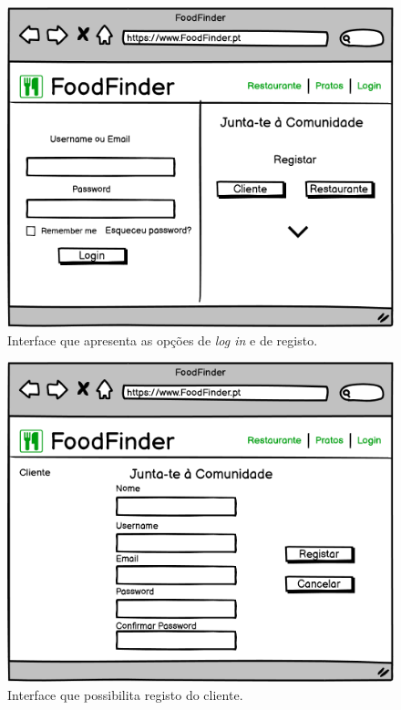\documentclass[a4paper,12pt]{report}
\begin{document}
	\begin{figure}[H]
	\begin{center}
	\includegraphics[scale=0.60]{Screen_Login}	
	\end{center}
	\caption{Interface que apresenta as opções de \textit{log in} e de registo.}
	\label{fig:Screen_Login}	
	\end{figure} 
	
	\begin{figure}[H]
	\begin{center}
	\includegraphics[scale=0.60]{Screen_Registo_Cliente}	
	\end{center}
	\caption{Interface que possibilita registo do cliente.}
	\label{fig:Screen_Registo_Cliente}	
	\end{figure} 
	
\end{document}
